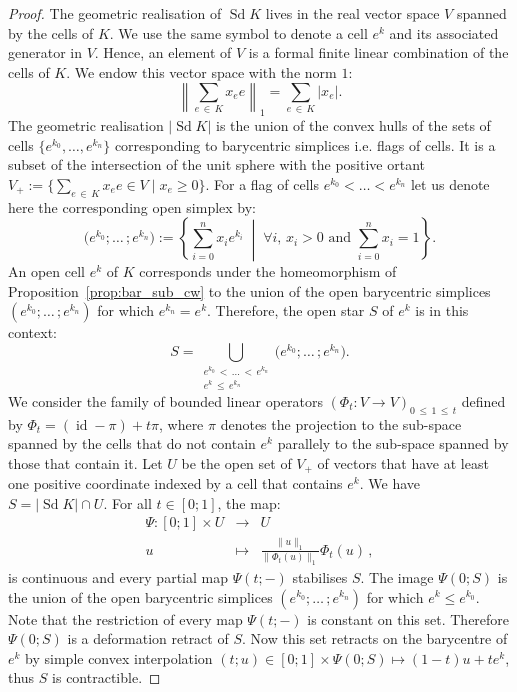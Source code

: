 \documentclass[10pt]{amsart}
\theoremstyle{definition}
\numberwithin{equation}{section}
\numberwithin{figure}{section}
\DeclareMathOperator{\Sd}{Sd}
\DeclareMathOperator{\id}{id}
\let\oldforall\forall
\renewcommand*{\forall}{\mathrel{\oldforall}}
\begin{document}
\begin{proof}
The geometric realisation of $\Sd K$ lives in the real vector space $V$ spanned by the cells of $K$. We use the same symbol to denote a cell $e^k$ and its associated generator in $V$. Hence, an element of $V$ is a formal finite linear combination of the cells of $K$. We endow this vector space with the norm $1$:
\begin{equation*}
\left\|\sum_{e\,\in\,K} x_ee\right\|_1=\sum_{e\,\in\,K}|x_e|.
\end{equation*}
The geometric realisation $|\Sd K|$ is the union of the convex hulls of the sets of cells $\{e^{k_0},\dots,e^{k_n}\}$ corresponding to barycentric simplices i.e. flags of cells. It is a subset of the intersection of the unit sphere with the positive ortant $V_+:=\{\sum_{e\,\in \,K}x_ee\in V\;|\;x_e\geq 0\}$. For a flag of cells $e^{k_0}<\dots<e^{k_n}$ let us denote here the corresponding open simplex by:
\begin{equation*}
\big(e^{k_0};\dots\,;e^{k_n}\big):=\left\{\sum_{i=0}^n x_ie^{k_i}\;\middle|\;\forall i,\, x_i>0\text{ and }\sum_{i=0}^n x_i=1\right\}.
\end{equation*}
An open cell $e^k$ of $K$ corresponds under the homeomorphism of Proposition~\ref{prop:bar_sub_cw} to the union of the open barycentric simplices $(e^{k_0};\dots\,;e^{k_n})$ for which $e^{k_n}=e^k$. Therefore, the open star $S$ of $e^k$ is in this context:
\begin{equation*}
S=\bigcup_{\substack{e^{k_0}\,<\,\dots\,<\,e^{k_n}\\e^k\,\leq\,e^{k_n}}}\big(e^{k_0};\dots\,;e^{k_n}\big).
\end{equation*}
We consider the family of bounded linear operators $(\Phi_t:V\rightarrow V)_{0\,\leq\,1\,\leq\,t}$ defined by $\Phi_t=(\id-\pi)+t\pi$, where $\pi$ denotes the projection to the sub-space spanned by the cells that do not contain $e^k$ parallely to the sub-space spanned by those that contain it. Let $U$ be the open set of $V_+$ of vectors that have at least one positive coordinate indexed by a cell that contains $e^k$. We have $S=|\Sd K|\cap U$. For all $t\in[0;1]$, the map:
\begin{equation*}
\begin{array}{rcl}
\Psi:[0;1]\times U& \longrightarrow & U \\%
u & \longmapsto & \frac{\|u\|_1}{\|\Phi_t(u)\|_1}\Phi_t(u)\,,
\end{array}
\end{equation*}
is continuous and every partial map $\Psi(t;-)$ stabilises $S$. The image $\Psi(0;S)$ is the union of the open barycentric simplices $(e^{k_0};\dots\,;e^{k_n})$ for which $e^k\leq e^{k_0}$. Note that the restriction of every map $\Psi(t;-)$ is constant on this set. Therefore $\Psi(0;S)$ is a deformation retract of $S$. Now this set retracts on the barycentre of $e^k$ by simple convex interpolation $(t;u)\in [0;1]\times\Psi(0;S)\mapsto (1-t)u+te^k$, thus $S$ is contractible.
\end{proof}
\end{document}
